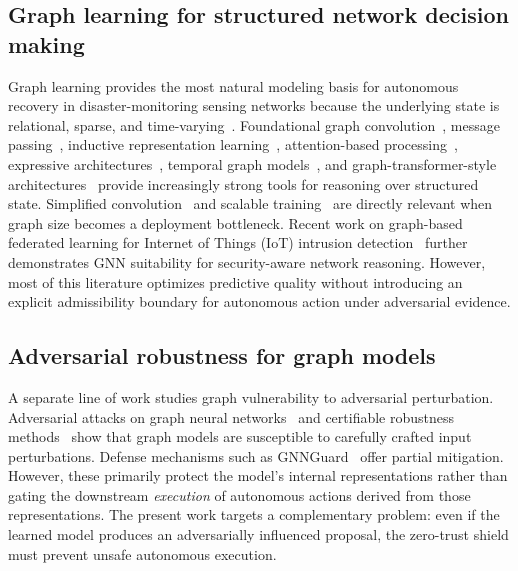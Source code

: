 \documentclass[10pt,journal,compsoc]{IEEEtran}
\begin{document}
\subsection{Graph learning for structured network decision making}
Graph learning provides the most natural modeling basis for autonomous recovery in disaster-monitoring sensing networks because the underlying state is relational, sparse, and time-varying~\cite{wu2021comprehensive}.
Foundational graph convolution~\cite{kipf2017gcn}, message passing~\cite{gilmer2017mpnn}, inductive representation learning~\cite{hamilton2017graphsage}, attention-based processing~\cite{velickovic2018gat}, expressive architectures~\cite{xu2019gin}, temporal graph models~\cite{rossi2020tgn}, and graph-transformer-style architectures~\cite{yun2019gtn} provide increasingly strong tools for reasoning over structured state.
Simplified convolution~\cite{wu2019sgc} and scalable training~\cite{chiang2019clustergcn} are directly relevant when graph size becomes a deployment bottleneck.
Recent work on graph-based federated learning for Internet of Things (IoT) intrusion detection~\cite{alharthi2025gnn} further demonstrates GNN suitability for security-aware network reasoning.
However, most of this literature optimizes predictive quality without introducing an explicit admissibility boundary for autonomous action under adversarial evidence.

\subsection{Adversarial robustness for graph models}
A separate line of work studies graph vulnerability to adversarial perturbation.
Adversarial attacks on graph neural networks~\cite{zugner2018adversarial,dai2018adversarial} and certifiable robustness methods~\cite{bojchevski2019certifiable} show that graph models are susceptible to carefully crafted input perturbations.
Defense mechanisms such as GNNGuard~\cite{zhang2020gnnguard} offer partial mitigation.
However, these primarily protect the model's internal representations rather than gating the downstream \emph{execution} of autonomous actions derived from those representations.
The present work targets a complementary problem: even if the learned model produces an adversarially influenced proposal, the zero-trust shield must prevent unsafe autonomous execution.
\end{document}
